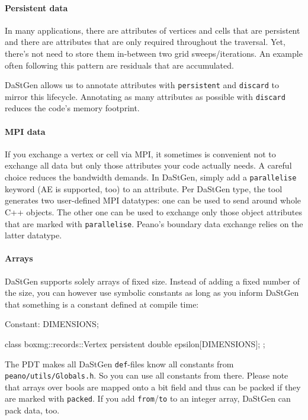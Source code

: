 \paragraph{Persistent data}
In many applications, there are attributes of vertices and cells that are
persistent and there are attributes that are only required throughout the
traversal.
Yet, there's not need to store them in-between two grid sweeps/iterations.
An example often following this pattern are residuals that are accumulated.


DaStGen allows us to annotate attributes with \texttt{persistent} and
\texttt{discard} to mirror this lifecycle.
Annotating as many attributes as possible with \texttt{discard} reduces the
code's memory footprint.
 


\paragraph{MPI data}

If you exchange a vertex or cell via MPI, it sometimes is convenient not to
exchange all data but only those attributes your code actually needs.
A careful choice reduces the bandwidth demands.
In DaStGen, simply add a \texttt{parallelise} keyword (AE is supported, too) to
an attribute.
Per DaStGen type, the tool generates two user-defined MPI datatypes: 
one can be used to send around whole C++ objects.
The other one can be used to exchange only those object attributes that are
marked with \texttt{parallelise}.
Peano's boundary data exchange relies on the latter datatype.


\paragraph{Arrays}

DaStGen supports solely arrays of fixed size.
Instead of adding a fixed number of the size, you can however use symbolic
constants as long as you inform DaStGen that something is a constant defined at
compile time:
\begin{code}
Constant: DIMENSIONS;

class boxmg::records::Vertex {  
  persistent double   epsilon[DIMENSIONS];
};
\end{code}

\noindent
The PDT makes all DaStGen \texttt{def}-files know all constants from
\texttt{peano/utils/Globals.h}.
So you can use all constants from there.
Please note that arrays over bools are mapped onto a bit field and thus can
be packed if they are marked with \texttt{packed}.
If you add \texttt{from}/\texttt{to} to an integer array, DaStGen can pack data,
too.



